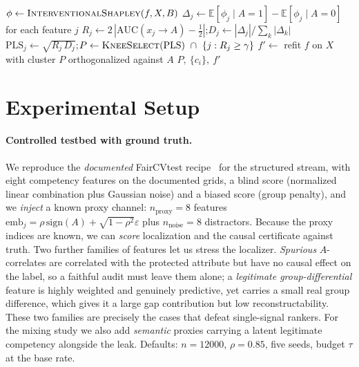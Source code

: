 \documentclass[sn-mathphys-num]{sn-jnl}
\newcommand{\PLS}{\mathrm{PLS}}
\newcommand{\Exp}{\mathbb{E}}
\begin{document}
\begin{algorithm}[tbp]
\caption{ProxyAudit: localize, certify, repair}
\label{alg:proxyaudit}
$\phi \leftarrow \textsc{InterventionalShapley}(f, X, B)$\;
$\Delta_j \leftarrow \Exp[\phi_j \mid A{=}1] - \Exp[\phi_j \mid A{=}0]$ \quad for each feature $j$ 
$R_j \leftarrow 2\,|\mathrm{AUC}(x_j \!\to\! A) - \tfrac12|$;\quad $D_j \leftarrow |\Delta_j| / \sum_k |\Delta_k|$\;
$\PLS_j \leftarrow \sqrt{R_j\, D_j}$;\quad $P \leftarrow \textsc{KneeSelect}(\PLS)\ \cap\ \{j : R_j \ge \gamma\}$\;
$f' \leftarrow$ refit $f$ on $X$ with cluster $P$ orthogonalized against $A$\;
\Return $P,\ \{c_i\},\ f'$\;
\end{algorithm}

\section{Experimental Setup}
\label{sec:setup}
\paragraph{Controlled testbed with ground truth.}
We reproduce the \emph{documented} FairCVtest recipe~\cite{pena2020faircv,
pena2023human} for the structured stream, with eight competency features on the
documented grids, a blind score (normalized linear combination plus Gaussian
noise) and a biased score (group penalty), and we \emph{inject} a known proxy
channel: $n_{\text{proxy}}{=}8$ features $\text{emb}_j=\rho\,\mathrm{sign}(A)+\sqrt{1-\rho^2}\varepsilon$
plus $n_{\text{noise}}{=}8$ distractors. Because the proxy indices are known, we
can \emph{score} localization and the causal certificate against truth. Two
further families of features let us stress the localizer. \emph{Spurious}
$A$-correlates are correlated with the protected attribute but have no causal
effect on the label, so a faithful audit must leave them alone; a
\emph{legitimate group-differential} feature is highly weighted and genuinely
predictive, yet carries a small real group difference, which gives it a large gap
contribution but low reconstructability. These two families are precisely the
cases that defeat single-signal rankers. For the mixing study we also add
\emph{semantic} proxies carrying a latent legitimate competency alongside the
leak. Defaults: $n{=}\num{12000}$, $\rho{=}0.85$, five seeds, budget $\tau$ at the
base rate.
\end{document}
